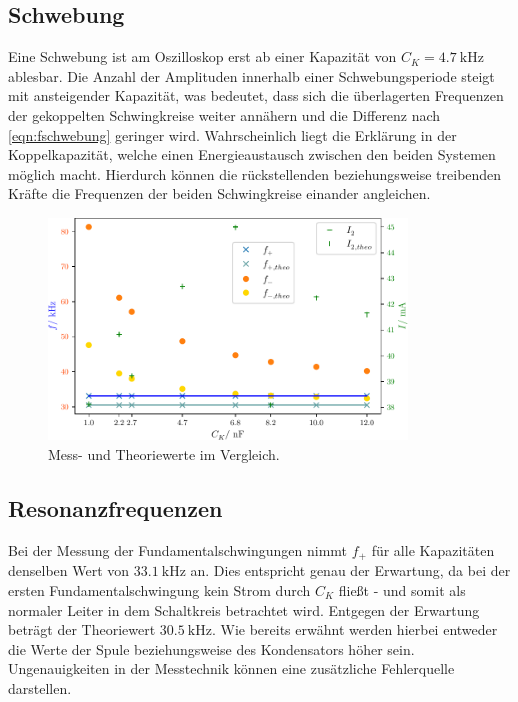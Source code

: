 \subsection{Schwebung}
Eine Schwebung ist am Oszilloskop erst ab einer Kapazität von $C_K = \SI{4.7}{\kilo\hertz}$ ablesbar. Die Anzahl der Amplituden innerhalb einer Schwebungsperiode
steigt mit ansteigender Kapazität, was bedeutet, dass sich die überlagerten Frequenzen der gekoppelten Schwingkreise weiter annähern und die Differenz nach \eqref{eqn:fschwebung} geringer wird.
Wahrscheinlich liegt die Erklärung in der Koppelkapazität, welche einen Energieaustausch zwischen den beiden Systemen möglich macht. Hierdurch können die rückstellenden 
beziehungsweise %
treibenden Kräfte
die Frequenzen der beiden Schwingkreise einander angleichen.

\begin{figure}
    \centering
    \includegraphics[width=0.85\textwidth]{plots/Messdaten_und_Theorie.pdf}
    \caption{Mess- und Theoriewerte im Vergleich.}
    \label{fig:mess_theo}
\end{figure}

\subsection{Resonanzfrequenzen}
Bei der Messung der Fundamentalschwingungen nimmt $f_+$ für alle Kapazitäten denselben Wert von $\SI{33.1}{\kilo\hertz}$ an. Dies entspricht genau der Erwartung,
da bei der ersten Fundamentalschwingung kein Strom durch $C_K$ fließt - und somit als normaler Leiter in dem Schaltkreis betrachtet wird.
Entgegen der Erwartung %
beträgt der Theoriewert $\SI{30.5}{\kilo\hertz}$. Wie bereits erwähnt werden hierbei entweder die Werte der Spule beziehungsweise des Kondensators höher sein.
Ungenauigkeiten in der Messtechnik können eine zusätzliche Fehlerquelle darstellen.

